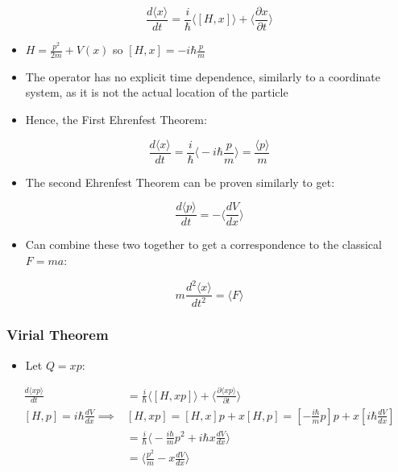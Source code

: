 \documentclass[a4paper,11pt,normalem]{article}
\begin{document}
\[
    \frac{d\langle x \rangle}{dt} = \frac{i}{\hbar}\langle[H, x]\rangle + \bigg\langle \frac{\partial x}{\partial t}\bigg\rangle
\]

\begin{itemize}
\item
  \(H = \frac{p^2}{2m} + V(x)\) so \([H, x] = -i\hbar\frac{p}{m}\)
\item
  The operator has no explicit time dependence, similarly to a
  coordinate system, as it is not the actual location of the particle
\item
  Hence, the First Ehrenfest Theorem:
\end{itemize}

\[
    \frac{d\langle x \rangle}{dt} = \frac{i}{\hbar}\bigg\langle -i\hbar\frac{p}{m}\bigg\rangle = \frac{\langle p \rangle}{m}
\]

\begin{itemize}
\item
  The second Ehrenfest Theorem can be proven similarly to get:
\end{itemize}

\[
    \frac{d\langle p \rangle}{dt} = -\bigg\langle\frac{dV}{dx}\bigg\rangle
\]

\begin{itemize}
\item
  Can combine these two together to get a correspondence to the
  classical \(F = ma\):
\end{itemize}

\[
    m\frac{d^2 \langle x \rangle}{dt^2} = \langle F \rangle
\]

\subsubsection{Virial Theorem}\label{virial-theorem}

\begin{itemize}
\item
  Let \(Q = xp\):
\end{itemize}

\[
    \begin{aligned}
    \frac{d\langle xp\rangle}{dt} &= \frac{i}{\hbar}\langle[H, xp]\rangle + \bigg\langle\frac{\partial \langle xp \rangle}{\partial t}\bigg\rangle \\
    [H, p] = i\hbar\frac{dV}{dx} \implies& [H, xp] = [H, x]p + x[H, p] = [-\frac{i\hbar}{m}p]p + x[i\hbar\frac{dV}{dx}] \\
    &= \frac{i}{\hbar}\bigg\langle -\frac{i\hbar}{m}p^2 + i\hbar x \frac{dV}{dx}\bigg\rangle \\
    &= \bigg\langle \frac{p^2}{m} - x\frac{dV}{dx}\bigg\rangle
    \end{aligned}
\]
\end{document}
